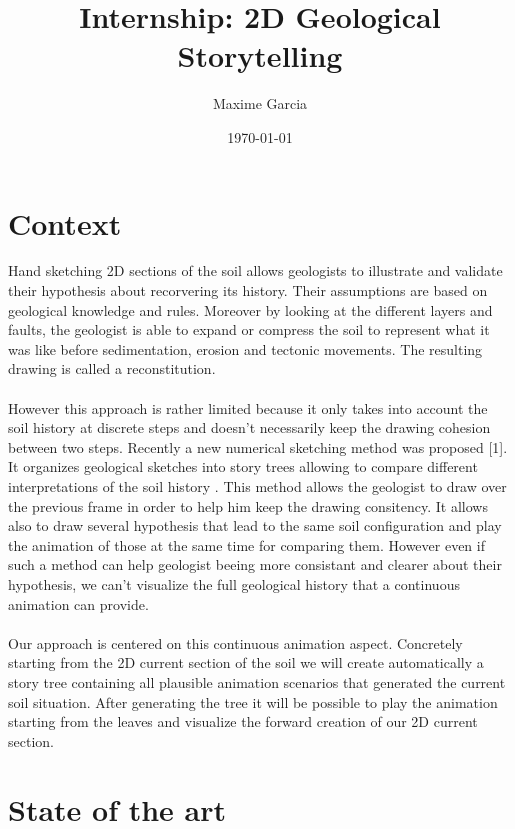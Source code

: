 \documentclass[a4paper,11pt]{article}
\title{Internship: 2D Geological Storytelling}
\author{Maxime Garcia}
\date{\today}
\begin{document}
\maketitle
\section{Context}

Hand sketching 2D sections of the soil allows geologists to illustrate and validate their hypothesis about recorvering its history. Their assumptions are based on geological knowledge and rules. Moreover by looking at the different layers and faults, the geologist is able to expand or compress the soil to represent what it was like before sedimentation, erosion and tectonic movements.
The resulting drawing is called a reconstitution. \\\\
However this approach is rather limited because it only takes into account the soil history at discrete steps and doesn't necessarily keep the drawing cohesion between two steps.
Recently a new numerical sketching method was proposed [1]. It organizes geological sketches into story trees allowing to compare different interpretations of the soil history . This method allows the geologist to draw over the previous frame in order to help him keep the drawing consitency. It allows also to draw several hypothesis that lead to the same soil configuration and play the animation of those at the same time for comparing them.
However even if such a method can help geologist beeing more consistant and clearer about their hypothesis, we can't visualize the full geological history that a continuous animation can provide.\\\\
Our approach is centered on this continuous animation aspect.
Concretely starting from the 2D current section of the soil we will create automatically a story tree containing all plausible animation scenarios that generated the current soil situation. After generating the tree it will be possible to play the animation starting from the leaves and visualize the forward creation of our 2D current section.


\section{State of the art}
\end{document}
